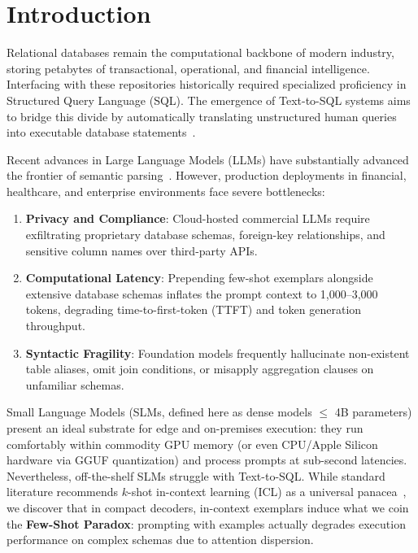 \documentclass[10pt,twocolumn,letterpaper]{article}
\theoremstyle{definition}
\begin{document}
\section{Introduction}
Relational databases remain the computational backbone of modern industry, storing petabytes of transactional, operational, and financial intelligence. Interfacing with these repositories historically required specialized proficiency in Structured Query Language (SQL). The emergence of Text-to-SQL systems aims to bridge this divide by automatically translating unstructured human queries into executable database statements~\cite{yu2018spider,li2023bird}.

Recent advances in Large Language Models (LLMs) have substantially advanced the frontier of semantic parsing~\cite{pourreza2023din}. However, production deployments in financial, healthcare, and enterprise environments face severe bottlenecks:
\begin{enumerate}
    \item \textbf{Privacy and Compliance}: Cloud-hosted commercial LLMs require exfiltrating proprietary database schemas, foreign-key relationships, and sensitive column names over third-party APIs.
    \item \textbf{Computational Latency}: Prepending few-shot exemplars alongside extensive database schemas inflates the prompt context to 1,000--3,000 tokens, degrading time-to-first-token (TTFT) and token generation throughput.
    \item \textbf{Syntactic Fragility}: Foundation models frequently hallucinate non-existent table aliases, omit join conditions, or misapply aggregation clauses on unfamiliar schemas.
\end{enumerate}

Small Language Models (SLMs, defined here as dense models $\le$ 4B parameters) present an ideal substrate for edge and on-premises execution: they run comfortably within commodity GPU memory (or even CPU/Apple Silicon hardware via GGUF quantization) and process prompts at sub-second latencies. Nevertheless, off-the-shelf SLMs struggle with Text-to-SQL. While standard literature recommends $k$-shot in-context learning (ICL) as a universal panacea~\cite{brown2020fewshot}, we discover that in compact decoders, in-context exemplars induce what we coin the \textbf{Few-Shot Paradox}: prompting with examples actually degrades execution performance on complex schemas due to attention dispersion.
\end{document}
